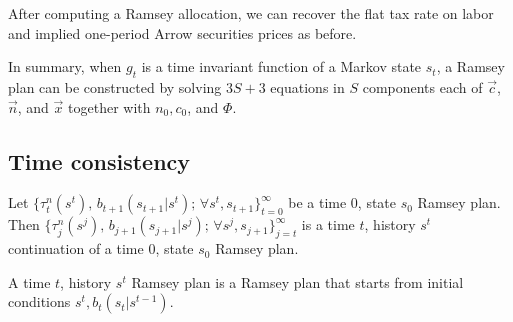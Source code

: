 \noindent After computing a Ramsey allocation, we can recover the flat tax rate on labor and implied one-period Arrow securities
prices as before.

%
%



In summary,  when $g_t$ is a time invariant function of a Markov state $s_t$, a Ramsey plan can be constructed
 by solving $3S +3$ equations in $S$ components each of  $\vec c$, $\vec n$, and $\vec x$
together with
$n_0, c_0$, and $\Phi$.











\subsection{Time consistency}

  Let $\{\tau^n_t(s^t),\,
 b_{t+1}(s_{t+1}|s^t);\, \forall s^t, s_{t+1}\}_{t=0}^\infty$
be a  time $0$, state $s_0$ Ramsey plan.
Then $\{\tau^n_j(s^j),\,
 b_{j+1}(s_{j+1}|s^j);\, \forall s^j, s_{j+1}\}_{j=t}^\infty$
is a  time $t$, history $s^t$
  continuation of a time $0$, state $s_0$  Ramsey plan.


\medskip
{} A time $t$, history $s^t$  Ramsey plan is a Ramsey plan  that starts from initial conditions $s^t, b_t(s_t|s^{t-1})$.



